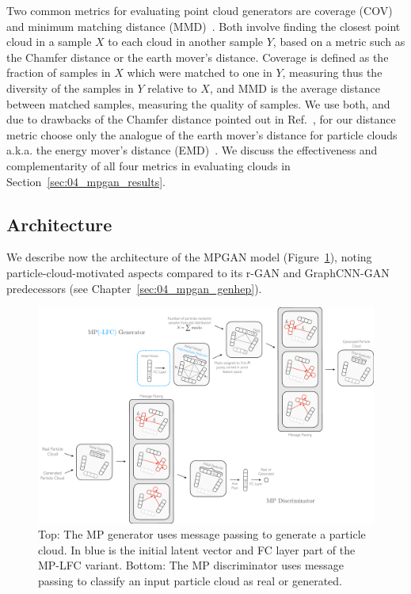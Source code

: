 Two common metrics for evaluating point cloud generators are coverage (COV) and minimum matching distance (MMD)~\cite{rgan}. 
Both involve finding the closest point cloud in a sample $X$ to each cloud in another sample $Y$, based on a metric such as the Chamfer distance or the earth mover's distance. 
Coverage is defined as the fraction of samples in $X$ which were matched to one in $Y$, measuring thus the diversity of the samples in $Y$ relative to $X$, and MMD is the average distance between matched samples, measuring the quality of samples. 
We use both, and due to drawbacks of the Chamfer distance pointed out in Ref.~\cite{rgan}, for our distance metric choose only the analogue of the earth mover's distance for particle clouds a.k.a. the energy mover's distance (EMD)~\cite{Komiske:2019fks}. 
We discuss the effectiveness and complementarity of all four metrics in evaluating clouds in Section~\ref{sec:04_mpgan_results}.


\subsection{Architecture}
\label{sec:04_mpgan_arch}

We describe now the architecture of the MPGAN model (Figure~\ref{fig:04_mpgan_arch}), noting particle-cloud-motivated aspects compared to its r-GAN and GraphCNN-GAN predecessors (see Chapter~\ref{sec:04_mpgan_genhep}).

\begin{figure}[t!]
    \centering
    \centerline{\includegraphics[width=\textwidth]{figures/04-ML4Sim/mpgan/mparch_wide.pdf}}
    \caption[Top: The MP generator uses message passing to generate a particle cloud.]{Top: The MP generator uses message passing to generate a particle cloud. 
    In blue is the initial latent vector and FC layer part of the MP-LFC variant.
    Bottom: The MP discriminator uses message passing to classify an input particle cloud as real or generated.}
    \label{fig:04_mpgan_arch}
\end{figure}


